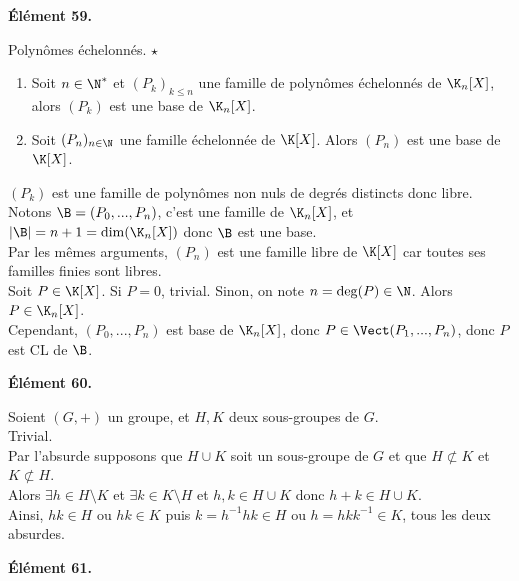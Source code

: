 \documentclass[11pt]{article}
\begin{document}
\bf{Élément 59.}

\begin{prop}{Polynômes échelonnés. $\star$}{}
    \begin{enumerate}
        \item Soit $n\in\N^*$ et $(P_k)_{k\leq n}$ une famille de polynômes échelonnés de $\K_n[X]$, alors $(P_k)$ est une base de $\K_n[X]$.
        \item Soit $(P_n)_{n\in\N}$ une famille échelonnée de $\K[X]$. Alors $(P_n)$ est une base de $\K[X]$.
    \end{enumerate}
    \tcblower
     $(P_k)$ est une famille de polynômes non nuls de degrés distincts donc libre.\\
    Notons $\B=(P_0,...,P_n)$, c'est une famille de $\K_n[X]$, et $|\B|=n+1=\dim(\K_n[X])$ donc $\B$ est une base.\\
     Par les mêmes arguments, $(P_n)$ est une famille libre de $\K[X]$ car toutes ses familles finies sont libres.\\
    Soit $P\in\K[X]$. Si $P=0$, trivial. Sinon, on note $n=\deg(P)\in\N$. Alors $P\in\K_n[X]$.\\
    Cependant, $(P_0,...,P_n)$ est base de $\K_n[X]$, donc $P\in\Vect(P_1,...,P_n)$, donc $P$ est CL de $\B$.
\end{prop}

\pagebreak

\bf{Élément 60.}

\begin{ex}{}{}
    Soient $(G,+)$ un groupe, et $H,K$ deux sous-groupes de $G$.\\
    \boxed{\la} Trivial.\\
    \boxed{\ra} Par l'absurde supposons que $H\cup K$ soit un sous-groupe de $G$ et que $H\not\subset K$ et $K\not\subset H$.\\
    Alors $\exists h \in H \setminus K$ et $\exists k \in K \setminus H$ et $h,k\in H\cup K$ donc $h+k\in H\cup K$.\\
    Ainsi, $hk\in H$ ou $hk\in K$ puis $k=h^{-1}hk\in H$ ou $h=hkk^{-1}\in K$, tous les deux absurdes.
\end{ex}

\vspace*{-0.4cm}

\bf{Élément 61.}
\end{document}
